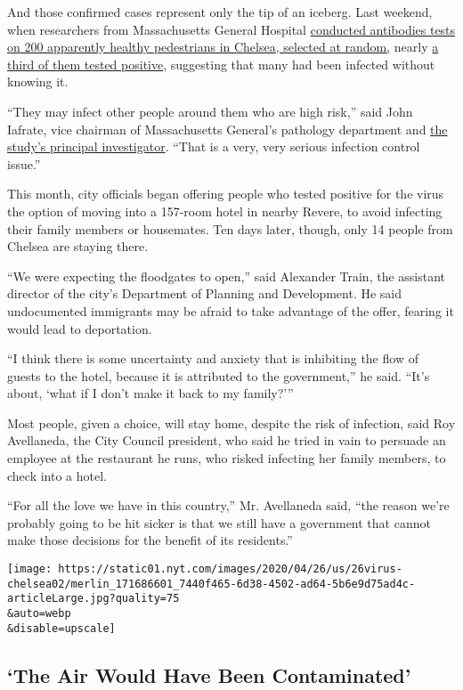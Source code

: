 And those confirmed cases represent only the tip of an iceberg. Last
weekend, when researchers from Massachusetts General Hospital
\href{https://www.bostonglobe.com/2020/04/17/business/nearly-third-200-blood-samples-taken-chelsea-show-exposure-coronavirus/}{conducted
antibodies tests on 200 apparently healthy pedestrians in Chelsea,
selected at random,} nearly
\href{http://chelsearecord.com/2020/04/23/mgh-researcher-finds-interesting-results-here/}{a
third of them tested positive}, suggesting that many had been infected
without knowing it.

``They may infect other people around them who are high risk,'' said
John Iafrate, vice chairman of Massachusetts General's pathology
department and \href{https://www.youtube.com/watch?v=GLQ9Alai5Ps}{the
study's principal investigator}. ``That is a very, very serious
infection control issue.''

This month, city officials began offering people who tested positive for
the virus the option of moving into a 157-room hotel in nearby Revere,
to avoid infecting their family members or housemates. Ten days later,
though, only 14 people from Chelsea are staying there.

``We were expecting the floodgates to open,'' said Alexander Train, the
assistant director of the city's Department of Planning and Development.
He said undocumented immigrants may be afraid to take advantage of the
offer, fearing it would lead to deportation.

``I think there is some uncertainty and anxiety that is inhibiting the
flow of guests to the hotel, because it is attributed to the
government,'' he said. ``It's about, `what if I don't make it back to my
family?'''

Most people, given a choice, will stay home, despite the risk of
infection, said Roy Avellaneda, the City Council president, who said he
tried in vain to persuade an employee at the restaurant he runs, who
risked infecting her family members, to check into a hotel.

``For all the love we have in this country,'' Mr. Avellaneda said, ``the
reason we're probably going to be hit sicker is that we still have a
government that cannot make those decisions for the benefit of its
residents.''

\texttt{[image: https://static01.nyt.com/images/2020/04/26/us/26virus-chelsea02/merlin\_171686601\_7440f465-6d38-4502-ad64-5b6e9d75ad4c-articleLarge.jpg?quality=75\\\&auto=webp\\\&disable=upscale]}

\hypertarget{the-air-would-have-been-contaminated}{%
\subsection{`The Air Would Have Been
Contaminated'}\label{the-air-would-have-been-contaminated}}

